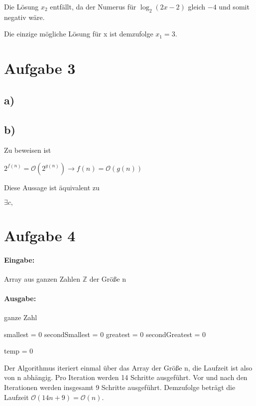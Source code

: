 \documentclass[12pt]{scrartcl}%
\theoremstyle{nonumberplain}
\begin{document}
Die Lösung $x_2$ entfällt, da der Numerus für $\log_{2}{(2x-2)}$ gleich $-4$ und somit negativ wäre.

Die einzige mögliche Lösung für x ist demzufolge $x_1 = 3$.

\newpage

\section*{Aufgabe 3}
\subsection*{a)}

\subsection*{b)}

Zu beweisen ist

$ 2^{f(n)} = \mathcal{O}(2^{g(n)}) \rightarrow f(n) = \mathcal{O}(g(n)) $

Diese Aussage ist äquivalent zu

$ \exists c,  $

\newpage

\section*{Aufgabe 4}

\paragraph{Eingabe:} Array aus ganzen Zahlen $\mathbb{Z}$ der Größe n

\paragraph{Ausgabe:} ganze Zahl

\begin{algorithm}[H]
	
	smallest = 0\;
	secondSmallest = 0\;
	greatest = 0\;
	secondGreatest = 0\;
	
	temp = 0\;
	

\end{algorithm}

\vspace{0.3cm}

Der Algorithmus iteriert einmal über das Array der Größe n, die Laufzeit ist also von n abhängig. Pro Iteration werden 14 Schritte ausgeführt. Vor und nach den Iterationen werden insgesamt 9 Schritte ausgeführt. Demzufolge beträgt die Laufzeit $\mathcal{O}(14n+9) = \mathcal{O}(n)$.
\end{document}
